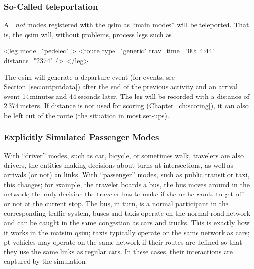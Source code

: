 \subsubsection{So-Called \Gls{teleportation}}
\label{sec:teleportation-qsim}
All \emph{not} modes registered with the \gls{qsim} as ``main modes'' will be teleported.  That is, the \gls{qsim} will, without problems, process legs such as
\begin{xml}
<leg mode="pedelec" >
   <route type="generic" trav_time="00:14:44" distance="2374" />
</leg>
\end{xml}
The \gls{qsim} will generate a departure event (for events, see Section~\ref{sec:outputdata}) after the end of the previous activity and an arrival event 14\,minutes and 44\,seconds later.  The leg will be recorded with a distance of 2\,374\,meters.  If  distance is not used for  scoring (\cf Chapter~\ref{ch:scoring}), it can also be left out of the route (the situation in most set-ups).

\subsubsection{Explicitly Simulated Passenger Modes}



With ``driver'' modes, such as car, bicycle, or sometimes walk,  travelers are also drivers, \ie the entities making decisions about turns at intersections, as well as arrivals (or not) on links.
%
With ``passenger'' modes, such as public transit or taxi, this changes; for example, the traveler boards a bus, the bus moves around in the network; the only decision the traveler has to make if she or he wants to get off or not at the current stop.  The bus, in turn, is a normal participant in the corresponding traffic system, \ie buses and taxis operate on the normal road network and can be caught in the same congestion as cars and trucks.  
%
This is exactly how it works in the \gls{matsim} \gls{qsim}; taxis typically operate on the same network as cars; pt vehicles may operate on the same network if their routes are defined so that they use the same links as regular cars. 
In these cases, their interactions are captured by the simulation. 



